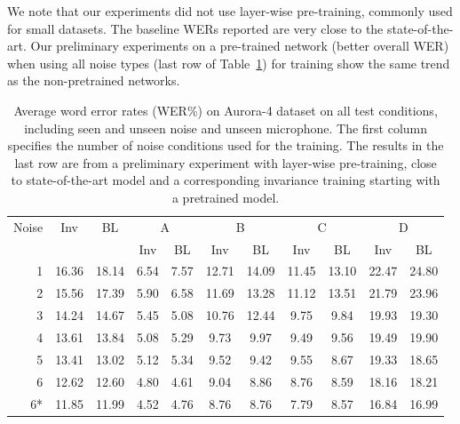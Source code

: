 \documentclass[a4paper]{article}
\begin{document}
We note that our experiments did not use layer-wise pre-training, commonly used for small
datasets. The baseline WERs reported are very close to the state-of-the-art. 
Our preliminary experiments on a pre-trained network (better overall WER) when 
using all noise types (last row of Table~\ref{tab:results}) for training show 
the same trend as the non-pretrained networks.
\begin{table}[t]
    \centering
    \caption{Average word error rates (WER\%) on Aurora-4 dataset on all test conditions,
        including seen and unseen noise and unseen microphone. The first column
        specifies the number of noise conditions used for the training. The
        results in the last row are from a preliminary experiment with
        layer-wise pre-training, close to state-of-the-art
        model and a corresponding invariance training starting with a pretrained model.}
    \label{tab:results}
    \begin{tabular}{r|cc||cc|cc|cc|cc}
        Noise       &Inv&BL&  \multicolumn{2}{c|}{A} & \multicolumn{2}{c|}{B} & \multicolumn{2}{c|}{C} & \multicolumn{2}{c}{D}\\
               & & &  Inv & BL & Inv & BL & Inv & BL & Inv & BL\\
    \hline
    1           &16.36        &18.14 &6.54&7.57    &12.71& 14.09   & 11.45&   13.10    & 22.47 &   24.80    \\
    2           &15.56        &17.39 &5.90&  6.58 &   11.69   &13.28   &11.12   &13.51   &21.79   &23.96 \\
    3           &14.24        &14.67 &5.45 & 5.08&    10.76&   12.44&   9.75&    9.84 &   19.93&   19.30\\
    4           &13.61        &13.84 & 5.08 &5.29    &9.73    &9.97    &9.49    &9.56    &19.49   &19.90\\         
    5           &13.41        &13.02 & 5.12 &5.34    &9.52    &9.42    &9.55    &8.67    &19.33   &18.65\\         
    6           &12.62        &12.60 & 4.80 &4.61    &9.04    &8.86    &8.76    &8.59    &18.16   &18.21\\
    \hline\hline
    6* &11.85        &11.99    &4.52    &4.76    &8.76    &8.76    &7.79    &8.57    &16.84&    16.99
    \end{tabular}
\end{table}
\end{document}
